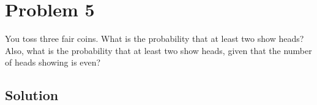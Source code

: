 \section{Problem 5}
You toss three fair coins. What is the probability that at least two show heads? Also, what is the probability that at least two show heads, given that the number of heads showing is even?

\subsection{Solution}